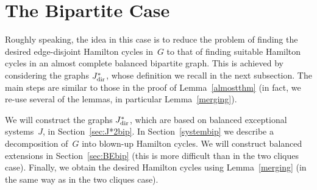 \documentclass{memo-l}
\numberwithin{section}{chapter}
\numberwithin{equation}{section}
\numberwithin{firstthm}{section}
\numberwithin{figure}{section}
\begin{document}
{%

\section{The Bipartite Case}
Roughly speaking, the idea in this case is to reduce the problem of finding the desired edge-disjoint Hamilton cycles in~$G$
to that of finding suitable Hamilton cycles in an almost complete balanced bipartite graph.
This is achieved by considering the graphs $J^*_{\rm dir}$, whose definition we recall in the next subsection.
The main steps are similar to those in the proof of Lemma~\ref{almostthm}
(in fact, we re-use several of the lemmas, in particular Lemma~\ref{merging}).

We will construct the graphs $J^*_{\rm dir}$, which are based on balanced exceptional systems~$J$, in Section~\ref{sec:J*2bip}.
In Section~\ref{systembip} we describe a decomposition of~$G$ into blown-up Hamilton cycles.
We will construct balanced extensions in Section~\ref{sec:BEbip}
(this is more difficult than in the two cliques case).
Finally, we obtain the desired Hamilton cycles using Lemma~\ref{merging} (in the same way as in the two cliques case).

}
\end{document}
